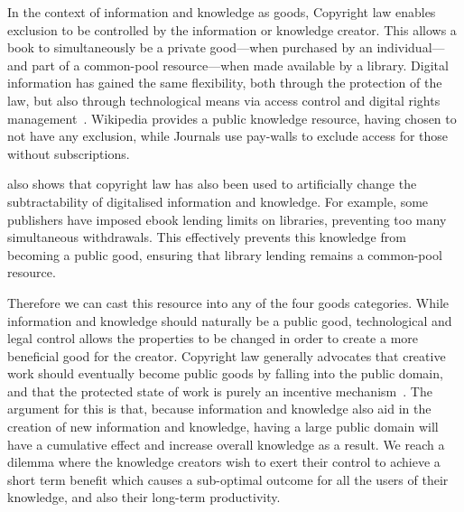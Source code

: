 In the context of information and knowledge as goods, Copyright law enables exclusion to be controlled by the information or knowledge creator. 
This allows a book to simultaneously be a private good---when purchased by an individual---and part of a common-pool resource---when made available by a library. 
Digital information has gained the same flexibility, both through the protection of the law, but also through technological means via access control and digital rights management~\citep{Lessig2004}. 
Wikipedia provides a public knowledge resource, having chosen to not have any exclusion, while Journals use pay-walls to exclude access for those without subscriptions.

\citet{Lessig2004} also shows that copyright law has also been used to artificially change the subtractability of digitalised information and knowledge. 
For example, some publishers have imposed ebook lending limits on libraries, preventing too many simultaneous withdrawals. 
This effectively prevents this knowledge from becoming a public good, ensuring that library lending remains a common-pool resource.

Therefore we can cast this resource into any of the four goods categories. 
While information and knowledge should naturally be a public good, technological and legal control allows the properties to be changed in order to create a more beneficial good for the creator. 
Copyright law generally advocates that creative work should eventually become public goods by falling into the public domain, and that the protected state of work is purely an incentive mechanism~\citep{Samuelson2006}. 
The argument for this is that, because information and knowledge also aid in the creation of new information and knowledge, having a large public domain will have a cumulative effect and increase overall knowledge as a result. 
We reach a dilemma where the knowledge creators wish to exert their control to achieve a short term benefit which causes a sub-optimal outcome for all the users of their knowledge, and also their long-term productivity.


